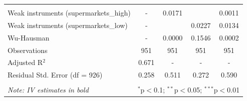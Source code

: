 \documentclass{article}
\begin{document}
\begin{table}[t]
\begin{tabular}{@{\extracolsep{5pt}}lcccc}
\hline \\[-1.8ex] 
Weak instruments (supermarkets\_high) & - & 0.0171 &  & 0.0011  \\ 
Weak instruments (supermarkets\_low) & - &  & 0.0227 & 0.0134 \\ 
Wu-Hausman & - & 0.0000 & 0.1546 & 0.0002\\ 
Observations & 951 & 951 & 951 & 951 \\ 
Adjusted R$^{2}$ & 0.671 & - & - & - \\ 
Residual Std. Error (df = 926) & 0.258 & 0.511 & 0.272 & 0.590 \\ 
\hline 
\hline \\[-1.8ex] 
\textit{Note: IV estimates in bold}  & \multicolumn{4}{r}{$^{*}$p$<$0.1; $^{**}$p$<$0.05; $^{***}$p$<$0.01} \\ 
\end{tabular} 
\end{table}
\end{document}
